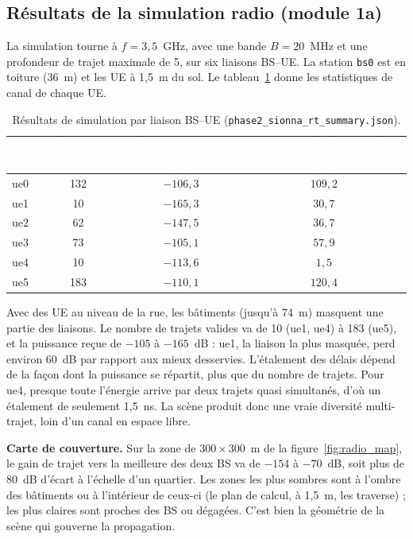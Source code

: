 \documentclass[12pt,a4paper,titlepage]{article}
\newcommand{\hd}[1]{\textcolor{white}{\textbf{#1}}}
\begin{document}
\subsection{Résultats de la simulation radio (module 1a)}
\label{subsec:res_phase2}

La simulation tourne à $f = 3{,}5$~GHz, avec une bande $B = 20$~MHz et une profondeur de trajet maximale de 5, sur six liaisons BS--UE. La station \texttt{bs0} est en toiture (36~m) et les UE à 1,5~m du sol. Le tableau~\ref{tab:res_phase2} donne les statistiques de canal de chaque UE.

\begin{table}[H]
    \centering
    \caption{Résultats de simulation par liaison BS--UE (\texttt{phase2\_sionna\_rt\_summary.json}).}
    \label{tab:res_phase2}
    \begin{tabular}{lccc}
        \toprule
        \rowcolor{tabhead}
        \hd{UE} & \hd{Trajets valides} & \hd{Puissance totale (dB)} & \hd{Étalement RMS des délais (ns)} \\
        \midrule
        ue0 & 132 & $-106{,}3$ & $109{,}2$ \\
        ue1 & 10  & $-165{,}3$ & $30{,}7$ \\
        ue2 & 62  & $-147{,}5$ & $36{,}7$ \\
        ue3 & 73  & $-105{,}1$ & $57{,}9$ \\
        ue4 & 10  & $-113{,}6$ & $1{,}5$ \\
        ue5 & 183 & $-110{,}1$ & $120{,}4$ \\
        \bottomrule
    \end{tabular}
\end{table}

Avec des UE au niveau de la rue, les bâtiments (jusqu'à 74~m) masquent une partie des liaisons. Le nombre de trajets valides va de 10 (ue1, ue4) à 183 (ue5), et la puissance reçue de $-105$ à $-165$~dB : ue1, la liaison la plus masquée, perd environ 60~dB par rapport aux mieux desservies. L'étalement des délais dépend de la façon dont la puissance se répartit, plus que du nombre de trajets. Pour ue4, presque toute l'énergie arrive par deux trajets quasi simultanés, d'où un étalement de seulement 1,5~ns. La scène produit donc une vraie diversité multi-trajet, loin d'un canal en espace libre.

\textbf{Carte de couverture.} Sur la zone de $300\times300$~m de la figure~\ref{fig:radio_map}, le gain de trajet vers la meilleure des deux BS va de $-154$ à $-70$~dB, soit plus de 80~dB d'écart à l'échelle d'un quartier. Les zones les plus sombres sont à l'ombre des bâtiments ou à l'intérieur de ceux-ci (le plan de calcul, à 1,5~m, les traverse) ; les plus claires sont proches des BS ou dégagées. C'est bien la géométrie de la scène qui gouverne la propagation.
\end{document}
